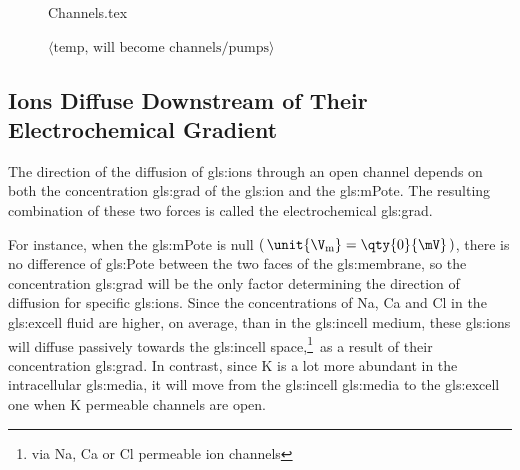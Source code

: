 \documentclass[class={myRUCProject}, crop=false]{standalone}
\begin{document}


\begin{figure}[H]
  \centering
  {Channels.tex}
  \caption{ $\langle \text{temp, will become channels/pumps} \rangle$ }\label{fig:Channels}
\end{figure}

\subsection{Ions Diffuse Downstream of Their Electrochemical Gradient}\label{sec:diffuseIon}

The direction of the diffusion of \glspl{gls:ion} through an open channel depends on both the concentration \gls{gls:grad} of the \gls{gls:ion} and the \gls{gls:mPote}. The resulting combination of these two forces is called the electrochemical \gls{gls:grad}.

For instance, when the \gls{gls:mPote} is null \(\br{\unit{\V\membrane}=\qty{0}{\mV}}\), there is no difference of \gls{gls:Pote} between the two faces of the \gls{gls:membrane}, so the concentration \gls{gls:grad} will be the only factor determining the direction of diffusion for specific \glspl{gls:ion}. 
Since the concentrations of \gls{Na}, \gls{Ca} and \gls{Cl} in the \gls{gls:excell} fluid are higher, on average, than in the \gls{gls:incell} medium, these \glspl{gls:ion} will diffuse passively towards the \gls{gls:incell} space,\footnote{via \gls{Na}, \gls{Ca} or \gls{Cl} permeable ion channels}~as a result of their concentration \gls{gls:grad}. 
In contrast, since \gls{K} is a lot more abundant in the intracellular \gls{gls:media}, it will move from the \gls{gls:incell} \gls{gls:media} to the \gls{gls:excell} one when \gls{K} permeable channels are open. 
\end{document}
